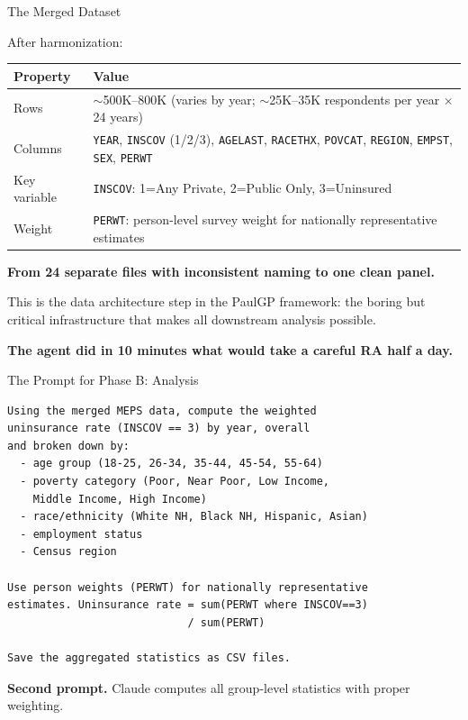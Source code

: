 \documentclass[10pt,english,aspectratio=169]{beamer}
\begin{document}
\begin{frame}{The Merged Dataset}

After harmonization:

\vspace{0.3cm}
\begin{small}
\begin{tabular}{lp{10cm}}
\toprule
\textbf{Property} & \textbf{Value} \\
\midrule
Rows & $\sim$500K--800K (varies by year; $\sim$25K--35K respondents per year $\times$ 24 years) \\
Columns & \texttt{YEAR}, \texttt{INSCOV} (1/2/3), \texttt{AGELAST}, \texttt{RACETHX}, \texttt{POVCAT}, \texttt{REGION}, \texttt{EMPST}, \texttt{SEX}, \texttt{PERWT} \\
Key variable & \texttt{INSCOV}: 1=Any Private, 2=Public Only, 3=Uninsured \\
Weight & \texttt{PERWT}: person-level survey weight for nationally representative estimates \\
\bottomrule
\end{tabular}
\end{small}

\vspace{0.3cm}
\textbf{From 24 separate files with inconsistent naming to one clean panel.}

\vspace{0.2cm}
This is the data architecture step in the PaulGP framework: the boring but critical infrastructure that makes all downstream analysis possible.

\vspace{0.2cm}
\textbf{The agent did in 10 minutes what would take a careful RA half a day.}

\end{frame}

\begin{frame}[fragile]{The Prompt for Phase B: Analysis}

\begin{lstlisting}[style=pythonstyle, language={}, basicstyle=\ttfamily\scriptsize]
Using the merged MEPS data, compute the weighted
uninsurance rate (INSCOV == 3) by year, overall
and broken down by:
  - age group (18-25, 26-34, 35-44, 45-54, 55-64)
  - poverty category (Poor, Near Poor, Low Income,
    Middle Income, High Income)
  - race/ethnicity (White NH, Black NH, Hispanic, Asian)
  - employment status
  - Census region

Use person weights (PERWT) for nationally representative
estimates. Uninsurance rate = sum(PERWT where INSCOV==3)
                            / sum(PERWT)

Save the aggregated statistics as CSV files.
\end{lstlisting}

\vspace{0.1cm}
\textbf{Second prompt.} Claude computes all group-level statistics with proper weighting.

\end{frame}
\end{document}
